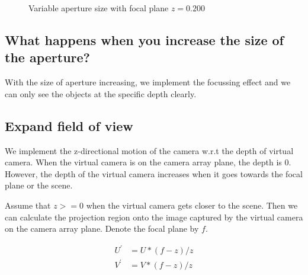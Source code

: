 \documentclass[acmtog]{acmart}
\begin{document}
\begin{figure}[htbp]
{				\label{fig:Fig23}}
			\quad
			\caption{Variable aperture size with focal plane $z=0.200$ }
		\end{figure}
	
		\subsection*{What happens when you increase the size of the aperture?}
			\quad With the size of aperture increasing, we implement the focussing effect and we can only see the objects at the specific depth clearly.
			
		\subsection{Expand field of view}
			\quad We implement the z-directional motion of the camera w.r.t the depth of virtual camera. When the virtual camera is on the camera array plane, the depth is $0$. However, the depth of the virtual camera increases when it goes towards the focal plane or the scene.
			
			Assume that $z>=0$ when the virtual camera gets closer to the scene. Then we can calculate the projection region onto the image captured by the virtual camera on the camera array plane. Denote the focal plane by $f$.
			
			\[
			\begin{aligned}
				U^\prime &= U * (f-z)/z \\
				V^\prime &= V * (f-z)/z
			\end{aligned}
			\]
			
\end{document}

